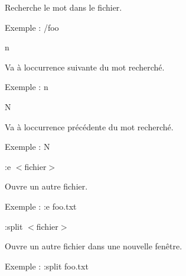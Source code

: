 \begin{DoxyEnumerate}
\begin{DoxyItemize}
\item Recherche le mot dans le fichier.
\item Exemple \+: {\ttfamily /foo}
\end{DoxyItemize}
\item {\ttfamily n}
\begin{DoxyItemize}
\item Va à l\textquotesingle{}occurrence suivante du mot recherché.
\item Exemple \+: {\ttfamily n}
\end{DoxyItemize}
\item {\ttfamily N}
\begin{DoxyItemize}
\item Va à l\textquotesingle{}occurrence précédente du mot recherché.
\item Exemple \+: {\ttfamily N}
\end{DoxyItemize}
\item {\ttfamily \+:e $<$fichier$>$}
\begin{DoxyItemize}
\item Ouvre un autre fichier.
\item Exemple \+: {\ttfamily \+:e foo.\+txt}
\end{DoxyItemize}
\item {\ttfamily \+:split $<$fichier$>$}
\begin{DoxyItemize}
\item Ouvre un autre fichier dans une nouvelle fenêtre.
\item Exemple \+: {\ttfamily \+:split foo.\+txt} 
\end{DoxyItemize}
\end{DoxyEnumerate}